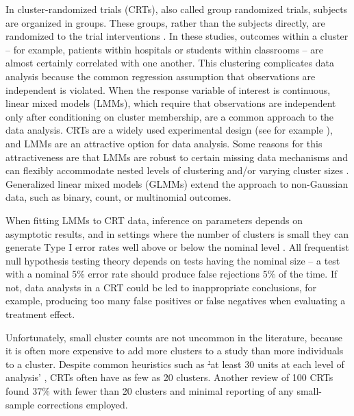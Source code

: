\documentclass[twocolumn]{bmcart}%
\providecommand{\DIFaddtex}[1]{{\protect\color{blue}\uwave{#1}}} %
\providecommand{\DIFdeltex}[1]{{\protect\color{red}\sout{#1}}}                      %
\providecommand{\DIFaddbegin}{} %
\providecommand{\DIFaddend}{} %
\providecommand{\DIFdelbegin}{} %
\providecommand{\DIFdelend}{} %
\providecommand{\DIFadd}[1]{\texorpdfstring{\DIFaddtex{#1}}{#1}} %
\providecommand{\DIFdel}[1]{\texorpdfstring{\DIFdeltex{#1}}{}} %
\begin{document}
In cluster-randomized trials (CRTs), also called group randomized trials, subjects are organized in groups. These groups, rather than the subjects directly, are randomized to the trial interventions \cite{hayes_cluster_2017}. In these studies, outcomes within a cluster -- for example, patients within hospitals or students within classrooms -- are almost certainly correlated with one another. This clustering complicates data analysis because the common regression assumption that observations are independent is violated. When the response variable of interest is continuous, linear mixed models (LMMs), which require that observations are independent only after conditioning on cluster membership, are a common approach to the data analysis. CRTs are a widely used experimental design (see for example \cite{moon_effect_2017, vinereanu_multifaceted_2017, huang_targeted_2013}), and LMMs are an attractive option for data analysis. Some reasons for this attractiveness are that LMMs are robust to certain missing data mechanisms and can flexibly accommodate nested levels of clustering and/or varying cluster sizes \cite{fitzmaurice_applied_2012}. Generalized linear mixed models (GLMMs) extend the approach to non-Gaussian data, such as binary, count, or multinomial outcomes.

When fitting LMMs to CRT data, inference on parameters depends on asymptotic results, and in settings where the number of clusters is small they can generate Type I error rates well above or below the nominal level \cite{pinheiro_mixed-effects_2009}. All frequentist null hypothesis testing theory depends on tests having the nominal size -- a test with a nominal 5\% error rate should produce false rejections 5\% of the time. If not, data analysts in a CRT could be led to inappropriate conclusions, for example, producing too many false positives or false negatives when evaluating a treatment effect.

Unfortunately, small cluster counts are not uncommon in the literature, because it is often more expensive to add more clusters to a study than more individuals to a cluster. Despite common heuristics such as \DIFdelbegin \DIFdel{'}\DIFdelend \DIFaddbegin \DIFadd{`}\DIFaddend at least 30 units at each level of analysis' \cite{kreft_introducing_1998}, CRTs often have as few as 20 clusters. Another review of 100 CRTs \cite{kahan_increased_2016} found 37\% with fewer than 20 clusters and minimal reporting of any small-sample corrections employed.
\end{document}
